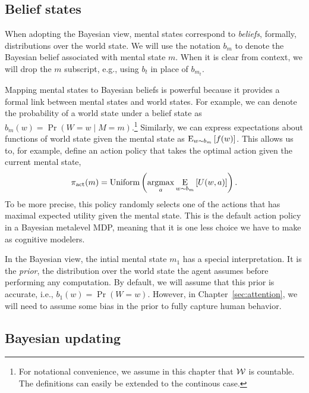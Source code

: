 \subsection{Belief states}

When adopting the Bayesian view, mental states correspond to \emph{beliefs}, formally, distributions over the world state. We will use the notation $b_m$ to denote the Bayesian belief associated with mental state $m$. When it is clear from context, we will drop the $m$ subscript, e.g., using $b_t$ in place of $b_{m_t}$. 

Mapping mental states to Bayesian beliefs is powerful because it provides a formal link between mental states and world states. For example, we can denote the probability of a world state under a belief state as $b_m(w) = \Pr(W = w \mid M = m)$.\footnote{%
  For notational convenience, we assume in this chapter that $\W$ is countable. The definitions can easily be extended to the continous case.
} Similarly, we can express expectations about functions of world state given the mental state as $\expectunder{f(w)}{w \sim b_m}$. This allows us to, for example, define an action policy that takes the optimal action given the current mental state,
\begin{equation}
  \pi\act(m) = \Uniform \left(\argmax_a \expectunder{U(w, a)}{w \sim b_m}\right).
\end{equation}
%
To be more precise, this policy randomly selects one of the actions that has maximal expected utility given the mental state. This is the default action policy in a Bayesian metalevel MDP, meaning that it is one less choice we have to make as cognitive modelers.

In the Bayesian view, the intial mental state $m_1$ has a special interpretation. It is the \emph{prior}, the distribution over the world state the agent assumes before performing any computation. By default, we will assume that this prior is accurate, i.e., $b_1(w) = \Pr(W=w)$. However, in Chapter~\ref{sec:attention}, we will need to assume some bias in the prior to fully capture human behavior. 

\subsection{Bayesian updating}

